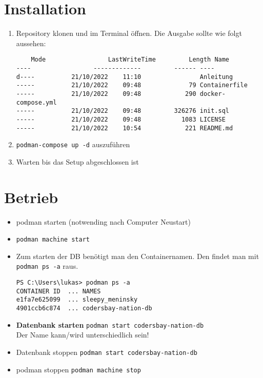 \documentclass[12pt, a4paper]{article}
\begin{document}
\newpage

\section*{Installation}
\begin{enumerate}
    \item Repository klonen und im Terminal öffnen. Die Ausgabe sollte wie folgt aussehen:
\begin{verbatim}
    Mode                 LastWriteTime         Length Name
----                 -------------         ------ ----
d----          21/10/2022    11:10                Anleitung
-----          21/10/2022    09:48             79 Containerfile
-----          21/10/2022    09:48            290 docker-compose.yml
-----          21/10/2022    09:48         326276 init.sql
-----          21/10/2022    09:48           1083 LICENSE
-----          21/10/2022    10:54            221 README.md
\end{verbatim}

    \item \texttt{podman-compose up -d} auszuführen
    \item Warten bis das Setup abgeschlossen ist
\end{enumerate}

\section*{Betrieb}
\begin{itemize}
    \item podman starten (notwending nach Computer Neustart)
    \item[] \texttt{podman machine start}
    \item Zum starten der DB benötigt man den Containernamen. Den findet man mit \texttt{podman ps -a} raus.
\begin{verbatim}
PS C:\Users\lukas> podman ps -a
CONTAINER ID  ... NAMES
e1fa7e625099  ... sleepy_meninsky
4901ccb6c874  ... codersbay-nation-db
\end{verbatim}

\item \textbf{Datenbank starten} \texttt{podman start codersbay-nation-db} \\
Der Name kann/wird unterschiedlich sein!

\item Datenbank stoppen \texttt{podman start codersbay-nation-db}
\item podman stoppen \texttt{podman machine stop}
\end{itemize}
\end{document}

